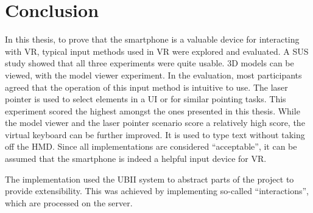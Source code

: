 \chapter{Conclusion}\label{chapter:conclusion}

In this thesis, to prove that the smartphone is a valuable device for interacting with \ac{VR}, typical input methods used in \ac{VR} were explored and evaluated. A \ac{SUS} study showed that all three experiments were quite usable. 
\ac{3D} models can be viewed, with the model viewer experiment. In the evaluation, most participants agreed that the operation of this input method is intuitive to use.
The laser pointer is used to select elements in a \ac{UI} or for similar pointing tasks. This experiment scored the highest amongst the ones presented in this thesis. 
While the model viewer and the laser pointer scenario score a relatively high score, the virtual keyboard can be further improved. It is used to type text without taking off the \ac{HMD}.
Since all implementations are considered \enquote{acceptable}, it can be assumed that the smartphone is indeed a helpful input device for \ac{VR}.

The implementation used the \ac{UBII} system to abstract parts of the project to provide extensibility. This was achieved by implementing so-called \enquote{interactions}, which are processed on the server. 